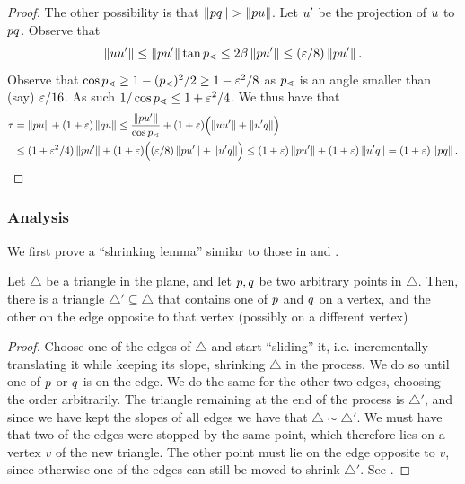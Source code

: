 \documentclass[12pt]{article}%
\begin{document}
\begin{proof}
    \medskip The other possibility is that
    $\left\| p q \right\| > \left\| p u \right\|$.  Let $u'$ be the projection of
    $u$ to $p q$. Observe that
    \begin{equation*}
        \dY{\pc}{\pc'}%
        \leq%
        \dY{\pa}{\pc'} \tan \angleX{\pa}%
        \leq%
        2\beta\dY{\pa}{\pc'} \leq (\eps/8) \dY{\pa}{\pc'}.
    \end{equation*}
    Observe that
    $\cos p_\sphericalangle \geq 1 - (p_\sphericalangle)^2/2 \geq 1-\varepsilon^2/8$ as
    $p_\sphericalangle$ is an angle smaller than (say) $\varepsilon/16$.  As such
    $1/\cos p_\sphericalangle \leq 1+\varepsilon^2/4$.  We thus have that
    \begin{align*}
      \tau
      &=%
        \dY{\pa}{\pc}%
        +%
        (1+\eps)\dY{\pb}{\pc}%
        \leq%
        \frac{\dY{\pa}{\pc'}}{\cos \angleX{\pa} }
        +(1+\eps)\pth{ \Bigl.
        \dY{\pc}{\pc'} + \dY{\pc'}{\pb}}
      \\&
      \leq %
      (1+\eps^2/4)\dY{\pa}{\pc'}
      + (1+\eps)\pth{\Bigl. (\eps/8) \dY{\pa}{\pc'}+ \dY{\pc'}{\pb}}
      \leq%
      (1+\eps)\dY{\pa}{\pc'} 
      + (1+\eps)\dY{\pc'}{\pb}
      =%
      (1+\eps)\dY{\pa}{\pb}.
    \end{align*}
\end{proof}

\subsubsection{Analysis}

We first prove a ``shrinking lemma'' similar to those in
 and .

\begin{lemma}
    Let $\triangle$ be a triangle in the plane, and let $p, q$ be
    two arbitrary points in $\triangle$. Then, there is a triangle
    $\triangle' \subseteq \triangle$ that contains one of $p$ and
    $q$ on a vertex, and the other on the edge opposite to that
    vertex (possibly on a different vertex)

\end{lemma}

\begin{proof}
    Choose one of the edges of $\triangle$ and start ``sliding'' it,
    i.e. incrementally translating it while keeping its slope,
    shrinking $\triangle$ in the process. We do so until one of $p$
    or $q$ is on the edge. We do the same for the other two edges,
    choosing the order arbitrarily. The triangle remaining at the end
    of the process is $\triangle'$, and since we have kept the slopes
    of all edges we have that $\triangle \sim \triangle'$. We must
    have that two of the edges were stopped by the same point, which
    therefore lies on a vertex $v$ of the new triangle. The other
    point must lie on the edge opposite to $v$, since otherwise one of
    the edges can still be moved to shrink $\triangle'$. See
    .

\end{proof}
\end{document}
